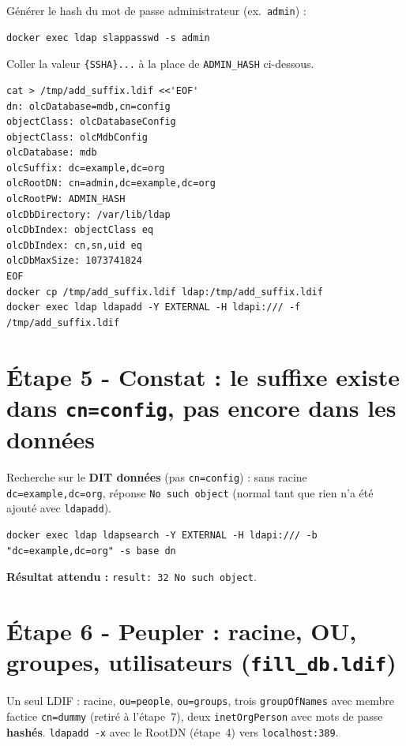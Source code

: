 \documentclass[11pt,a4paper]{report}
\begin{document}
Générer le hash du mot de passe administrateur (ex.\ \texttt{admin}) :

\begin{lstlisting}[style=bashstyle]
docker exec ldap slappasswd -s admin
\end{lstlisting}

Coller la valeur \texttt{\{SSHA\}...} à la place de \texttt{ADMIN\_HASH} ci-dessous.

\begin{lstlisting}[style=bashstyle]
cat > /tmp/add_suffix.ldif <<'EOF'
dn: olcDatabase=mdb,cn=config
objectClass: olcDatabaseConfig
objectClass: olcMdbConfig
olcDatabase: mdb
olcSuffix: dc=example,dc=org
olcRootDN: cn=admin,dc=example,dc=org
olcRootPW: ADMIN_HASH
olcDbDirectory: /var/lib/ldap
olcDbIndex: objectClass eq
olcDbIndex: cn,sn,uid eq
olcDbMaxSize: 1073741824
EOF
docker cp /tmp/add_suffix.ldif ldap:/tmp/add_suffix.ldif
docker exec ldap ldapadd -Y EXTERNAL -H ldapi:/// -f /tmp/add_suffix.ldif
\end{lstlisting}

\section{Étape 5 - Constat : le suffixe existe dans \texttt{cn=config}, pas encore dans les données}

Recherche sur le \textbf{DIT données} (pas \texttt{cn=config}) : sans racine \texttt{dc=example,dc=org}, réponse \texttt{No such object} (normal tant que rien n'a été ajouté avec \texttt{ldapadd}).

\begin{lstlisting}[style=bashstyle]
docker exec ldap ldapsearch -Y EXTERNAL -H ldapi:/// -b "dc=example,dc=org" -s base dn
\end{lstlisting}

\textbf{Résultat attendu :} \texttt{result: 32 No such object}.

\section{Étape 6 - Peupler : racine, OU, groupes, utilisateurs (\texttt{fill\_db.ldif})}

Un seul LDIF : racine, \texttt{ou=people}, \texttt{ou=groups}, trois \texttt{groupOfNames} avec membre factice \texttt{cn=dummy} (retiré à l'étape~7), deux \texttt{inetOrgPerson} avec mots de passe \textbf{hashés}. \texttt{ldapadd -x} avec le RootDN (étape~4) vers \texttt{localhost:389}.
\end{document}
